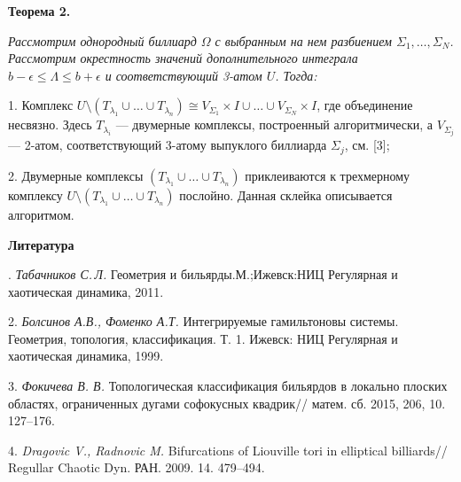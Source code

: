 \textbf{Теорема 2.} {\it
	Рассмотрим однородный биллиард $\Omega$ с выб\-ран\-ным на нем разбиением $\Sigma_1, \ldots, \Sigma_N$. Рассмотрим окрест\-ность значений дополнительного интеграла $b - \epsilon \leq \Lambda \leq b + \epsilon$ и соответствующий 3-атом $U$. Тогда:
	
1. Комплекс $U \setminus (T_{\lambda_1}\cup\ldots\cup T_{\lambda_n}) \cong V_{\Sigma_1} \times I \cup \ldots \cup V_{\Sigma_N} \times I$, где объединение несвязно. Здесь $T_{\lambda_i}$ --- двумерные комплексы, построенный алгорит\-мически, а $V_{\Sigma_j}$ --- 2-атом, соот\-вет\-ствующий 3-атому выпуклого бил\-лиарда $\Sigma_j$, см. [3];
	
2. Двумерные комплексы $(T_{\lambda_1} \cup \ldots \cup T_{\lambda_n})$ приклеиваются к трехмерному комплексу $U \setminus (T_{\lambda_1} \cup \ldots \cup T_{\lambda_n})$ послойно. Данная склейка описывается алгоритмом.}







\smallskip \centerline {\bf Литература} . {\it Табачников С.\,Л.}
Геометрия и бильярды.М.;Ижевск:НИЦ  Регулярная и хаотическая динамика, 2011.

2. {\it Болсинов А.В., Фоменко А.Т.}
Интегрируемые гамиль\-тоновы системы. Геометрия, топология, классификация. Т. 1. Ижевск: НИЦ Регулярная и хаотическая динамика, 1999.

3. {\it Фокичева В. В.}
Топологическая классификация бильярдов в локально плоских областях, ограниченных дугами софокусных квадрик//
матем. сб. 2015, 206, 10. 127--176.

4. {\it Dragovic V., Radnovic M.}
Bifurcations of Liouville tori in elliptical billiards//
Regullar Chaotic Dyn. РАН. 2009. 14. 479--494.


